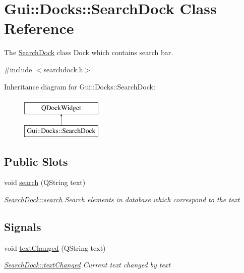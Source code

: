 \hypertarget{classGui_1_1Docks_1_1SearchDock}{}\section{Gui\+:\+:Docks\+:\+:Search\+Dock Class Reference}
\label{classGui_1_1Docks_1_1SearchDock}


The \hyperlink{classGui_1_1Docks_1_1SearchDock}{Search\+Dock} class Dock which contains search bar.  




{\ttfamily \#include $<$searchdock.\+h$>$}

Inheritance diagram for Gui\+:\+:Docks\+:\+:Search\+Dock\+:\begin{figure}[H]
\begin{center}
\leavevmode
\includegraphics[height=2.000000cm]{de/db4/classGui_1_1Docks_1_1SearchDock}
\end{center}
\end{figure}
\subsection*{Public Slots}
\begin{DoxyCompactItemize}
\item 
void \hyperlink{classGui_1_1Docks_1_1SearchDock_a7360b52fd0bc03e089049b574e509c02}{search} (Q\+String text)
\begin{DoxyCompactList}\small\item\em \hyperlink{classGui_1_1Docks_1_1SearchDock_a7360b52fd0bc03e089049b574e509c02}{Search\+Dock\+::search} Search elements in database which correspond to the {\itshape text} \end{DoxyCompactList}\end{DoxyCompactItemize}
\subsection*{Signals}
\begin{DoxyCompactItemize}
\item 
void \hyperlink{classGui_1_1Docks_1_1SearchDock_a9b33dea8adfe26b4d7a5dadffbbb07a7}{text\+Changed} (Q\+String text)
\begin{DoxyCompactList}\small\item\em \hyperlink{classGui_1_1Docks_1_1SearchDock_a9b33dea8adfe26b4d7a5dadffbbb07a7}{Search\+Dock\+::text\+Changed} Current text changed by {\itshape text} \end{DoxyCompactList}\end{DoxyCompactItemize}
